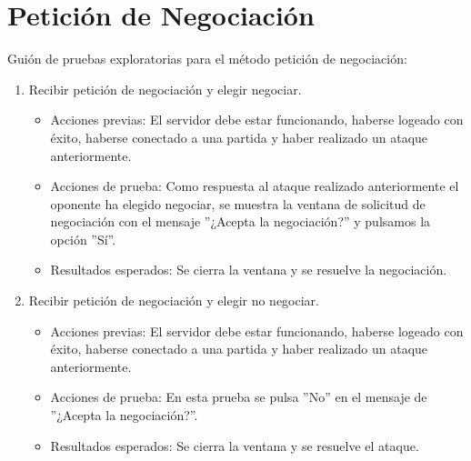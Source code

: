 \section{Petición de Negociación}

Guión de pruebas exploratorias para el método petición de negociación:

\begin{enumerate}
\item Recibir petición de negociación y elegir negociar.
	\begin{itemize}
	\item Acciones previas: El servidor debe estar funcionando, haberse logeado con éxito, haberse conectado a una partida y haber realizado un ataque anteriormente.
	\item Acciones de prueba: Como respuesta al ataque realizado anteriormente el oponente ha elegido negociar, se muestra la ventana de solicitud de negociación con el mensaje ''¿Acepta la negociación?'' y pulsamos la opción ''Sí''.
	\item Resultados esperados: Se cierra la ventana y se resuelve la negociación.
	\end{itemize}
	
\item Recibir petición de negociación y elegir no negociar.
	\begin{itemize}
	\item Acciones previas: El servidor debe estar funcionando, haberse logeado con éxito, haberse conectado a una partida y haber realizado un ataque anteriormente.
	\item Acciones de prueba: En esta prueba se pulsa ''No'' en el mensaje de ''¿Acepta la negociación?''.
	\item Resultados esperados: Se cierra la ventana y se resuelve el ataque.
	\end{itemize}
\end{enumerate}

